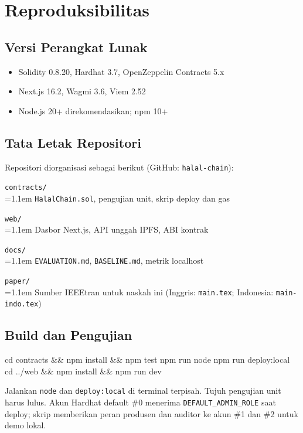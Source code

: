 \section{Reproduksibilitas}
\label{app:repro}

\subsection{Versi Perangkat Lunak}
\begin{itemize}
  \item Solidity 0.8.20, Hardhat 3.7, OpenZeppelin Contracts 5.x
  \item Next.js 16.2, Wagmi 3.6, Viem 2.52
  \item Node.js 20+ direkomendasikan; npm 10+
\end{itemize}

\subsection{Tata Letak Repositori}
Repositori diorganisasi sebagai berikut (GitHub: \texttt{halal-chain}):

\vspace{0.2em}
\noindent\texttt{contracts/}\\
\noindent\hspace{1.1em}\hangindent=1.1em
\texttt{HalalChain.sol}, pengujian unit, skrip deploy dan gas

\vspace{0.15em}
\noindent\texttt{web/}\\
\noindent\hspace{1.1em}\hangindent=1.1em
Dasbor Next.js, API unggah IPFS, ABI kontrak

\vspace{0.15em}
\noindent\texttt{docs/}\\
\noindent\hspace{1.1em}\hangindent=1.1em
\texttt{EVALUATION.md}, \texttt{BASELINE.md}, metrik localhost

\vspace{0.15em}
\noindent\texttt{paper/}\\
\noindent\hspace{1.1em}\hangindent=1.1em
Sumber IEEEtran untuk naskah ini (Inggris: \texttt{main.tex}; Indonesia: \texttt{main-indo.tex})

\subsection{Build dan Pengujian}
\begin{Code}
cd contracts && npm install && npm test
npm run node
npm run deploy:local
cd ../web && npm install && npm run dev
\end{Code}
Jalankan \texttt{node} dan \texttt{deploy:local} di terminal terpisah.
Tujuh pengujian unit harus lulus.
Akun Hardhat default \#0 menerima \texttt{DEFAULT\_ADMIN\_ROLE} saat deploy; skrip memberikan peran produsen dan auditor ke akun \#1 dan \#2 untuk demo lokal.

